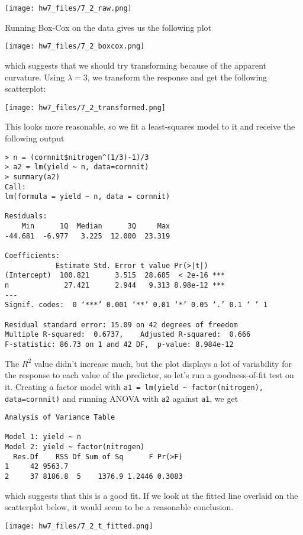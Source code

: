 \documentclass{article}
\begin{document}
\texttt{[image: hw7\_files/7\_2\_raw.png]}

Running Box-Cox on the data gives us the following plot 

\texttt{[image: hw7\_files/7\_2\_boxcox.png]}

which suggests that we should try transforming because of the apparent curvature. Using $\lambda=3$, we transform the response and get the following scatterplot:

\texttt{[image: hw7\_files/7\_2\_transformed.png]}

This looks more reasonable, so we fit a least-squares model to it and receive the following output

\begin{verbatim}
> n = (cornnit$nitrogen^(1/3)-1)/3
> a2 = lm(yield ~ n, data=cornnit)
> summary(a2)
Call:
lm(formula = yield ~ n, data = cornnit)

Residuals:
    Min      1Q  Median      3Q     Max 
-44.681  -6.977   3.225  12.000  23.319 

Coefficients:
            Estimate Std. Error t value Pr(>|t|)    
(Intercept)  100.821      3.515  28.685  < 2e-16 ***
n             27.421      2.944   9.313 8.98e-12 ***
---
Signif. codes:  0 ‘***’ 0.001 ‘**’ 0.01 ‘*’ 0.05 ‘.’ 0.1 ‘ ’ 1

Residual standard error: 15.09 on 42 degrees of freedom
Multiple R-squared:  0.6737,    Adjusted R-squared:  0.666 
F-statistic: 86.73 on 1 and 42 DF,  p-value: 8.984e-12
\end{verbatim}

The $R^2$ value didn't increase much, but the plot displays a lot of variability for the response to each value of the predictor, so let's run a goodness-of-fit test on it. Creating a factor model with \verb|a1 = lm(yield ~ factor(nitrogen), data=cornnit)| and running ANOVA with \verb|a2| against \verb|a1|, we get
\begin{verbatim}
Analysis of Variance Table

Model 1: yield ~ n
Model 2: yield ~ factor(nitrogen)
  Res.Df    RSS Df Sum of Sq      F Pr(>F)
1     42 9563.7                           
2     37 8186.8  5    1376.9 1.2446 0.3083
\end{verbatim}

which suggests that this is a good fit. If we look at the fitted line overlaid on the scatterplot below, it would seem to be a reasonable conclusion.

\texttt{[image: hw7\_files/7\_2\_t\_fitted.png]}
\end{document}
